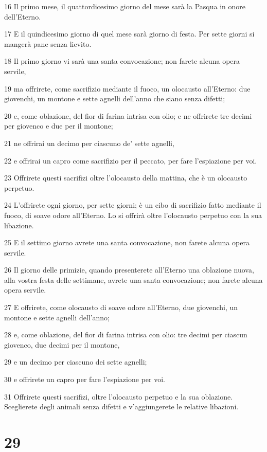 \par 16 Il primo mese, il quattordicesimo giorno del mese sarà la Pasqua in onore dell'Eterno.
\par 17 E il quindicesimo giorno di quel mese sarà giorno di festa. Per sette giorni si mangerà pane senza lievito.
\par 18 Il primo giorno vi sarà una santa convocazione; non farete alcuna opera servile,
\par 19 ma offrirete, come sacrifizio mediante il fuoco, un olocausto all'Eterno: due giovenchi, un montone e sette agnelli dell'anno che siano senza difetti;
\par 20 e, come oblazione, del fior di farina intrisa con olio; e ne offrirete tre decimi per giovenco e due per il montone;
\par 21 ne offrirai un decimo per ciascuno de' sette agnelli,
\par 22 e offrirai un capro come sacrifizio per il peccato, per fare l'espiazione per voi.
\par 23 Offrirete questi sacrifizi oltre l'olocausto della mattina, che è un olocausto perpetuo.
\par 24 L'offrirete ogni giorno, per sette giorni; è un cibo di sacrifizio fatto mediante il fuoco, di soave odore all'Eterno. Lo si offrirà oltre l'olocausto perpetuo con la sua libazione.
\par 25 E il settimo giorno avrete una santa convocazione, non farete alcuna opera servile.
\par 26 Il giorno delle primizie, quando presenterete all'Eterno una oblazione nuova, alla vostra festa delle settimane, avrete una santa convocazione; non farete alcuna opera servile.
\par 27 E offrirete, come olocausto di soave odore all'Eterno, due giovenchi, un montone e sette agnelli dell'anno;
\par 28 e, come oblazione, del fior di farina intrisa con olio: tre decimi per ciascun giovenco, due decimi per il montone,
\par 29 e un decimo per ciascuno dei sette agnelli;
\par 30 e offrirete un capro per fare l'espiazione per voi.
\par 31 Offrirete questi sacrifizi, oltre l'olocausto perpetuo e la sua oblazione. Sceglierete degli animali senza difetti e v'aggiungerete le relative libazioni.

\chapter{29}

